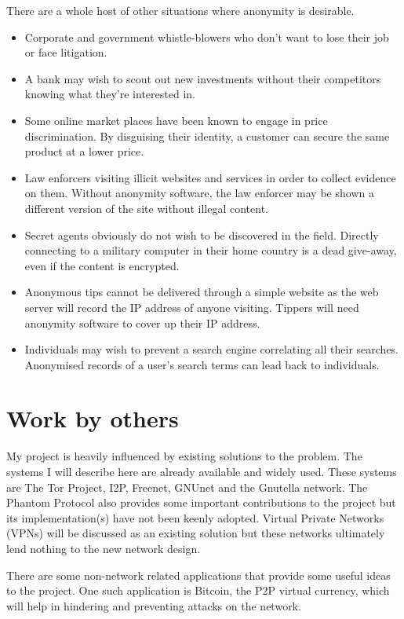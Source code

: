 \documentclass[ %
                    author={Luke Murray},
                supervisor={Dr. Simon Hollis},
                     title={Shadow Peer-to-Peer Networks},
                  subtitle={},
                    degree={MEng},
                      year={2013} ]{thesis}
\begin{document}
There are a whole host of other situations where anonymity is desirable.
\begin{itemize}
\item Corporate and government whistle-blowers who don't want to lose their job or face litigation.
\item A bank may wish to scout out new investments without their competitors knowing what they're interested in.
\item Some online market places have been known to engage in price discrimination. By disguising their identity, a customer can secure the same product at a lower price.
\item Law enforcers visiting illicit websites and services in order to collect evidence on them. Without anonymity software, the law enforcer may be shown a different version of the site without illegal content.
\item Secret agents obviously do not wish to be discovered in the field. Directly connecting to a military computer in their home country is a dead give-away, even if the content is encrypted.
\item Anonymous tips cannot be delivered through a simple website as the web server will record the IP address of anyone visiting. Tippers will need anonymity software to cover up their IP address.
\item Individuals may wish to prevent a search engine correlating all their searches. Anonymised records of a user's search terms can lead back to individuals\cite{Aol}.
\end{itemize}

\section{Work by others}

My project is heavily influenced by existing solutions to the problem. The systems I will describe here are already available and widely used. These systems are The Tor Project\cite{Tor}, I2P\cite{I2P}, Freenet\cite{Freenet}, GNUnet\cite{GNUnet} and the Gnutella network\cite{Gnutella}. The Phantom Protocol\cite{Phantom} also provides some important contributions to the project but its implementation(s) have not been keenly adopted. Virtual Private Networks (VPNs) will be discussed as an existing solution but these networks ultimately lend nothing to the new network design. 

There are some non-network related applications that provide some useful ideas to the project. One such application is Bitcoin, the P2P virtual currency, which will help in hindering and preventing attacks on the network. 
\end{document}
